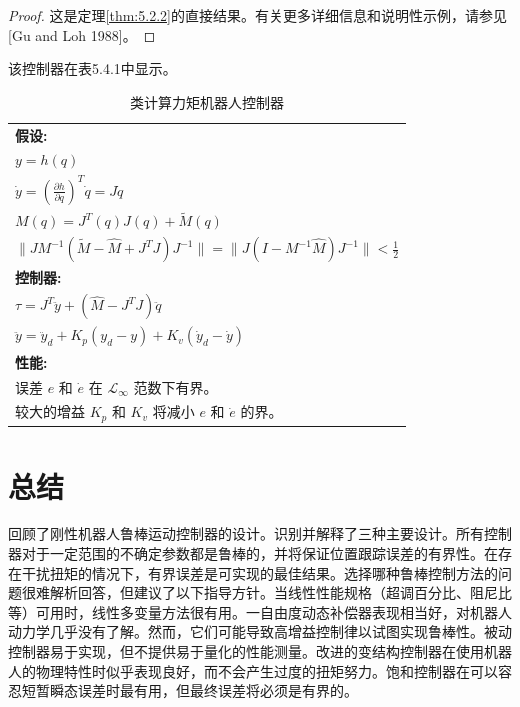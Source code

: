 \documentclass[UTF8,12pt,a4paper]{ctexart}
\begin{document}
\begin{proof}
这是定理\ref{thm:5.2.2}的直接结果。有关更多详细信息和说明性示例，请参见[Gu and Loh 1988]。
\end{proof}

该控制器在表5.4.1中显示。

\begin{table}[htbp]
\centering
\caption{类计算力矩机器人控制器}
\label{tab:5.4.1}
\begin{tabular}{@{}l@{}}
\toprule
\textbf{假设:} \\
\quad $y = h(q)$ \\[1em]
\quad $\dot{y} = \left(\frac{\partial h}{\partial q}\right)^T \dot{q} = J\dot{q}$ \\[1em]
\quad $M(q) = J^T(q)J(q) + \tilde{M}(q)$ \\[1em]
\quad $\|JM^{-1}(\tilde{M} - \hat{M} + J^T J)J^{-1}\| = \|J(I - M^{-1}\hat{M})J^{-1}\| < \frac{1}{2}$ \\[1em]
\midrule
\textbf{控制器:} \\
\quad $\tau = J^T \ddot{y} + (\hat{M} - J^T J)\ddot{q}$ \\[0.5em]
\quad $\ddot{y} = \ddot{y}_d + K_p(y_d - y) + K_v(\dot{y}_d - \dot{y})$ \\[1em]
\midrule
\textbf{性能:} \\
\quad 误差 $e$ 和 $\dot{e}$ 在 $\mathcal{L}_\infty$ 范数下有界。 \\
\quad 较大的增益 $K_p$ 和 $K_v$ 将减小 $e$ 和 $\dot{e}$ 的界。 \\
\bottomrule
\end{tabular}
\end{table}

\section{总结}

回顾了刚性机器人鲁棒运动控制器的设计。识别并解释了三种主要设计。所有控制器对于一定范围的不确定参数都是鲁棒的，并将保证位置跟踪误差的有界性。在存在干扰扭矩的情况下，有界误差是可实现的最佳结果。选择哪种鲁棒控制方法的问题很难解析回答，但建议了以下指导方针。当线性性能规格（超调百分比、阻尼比等）可用时，线性多变量方法很有用。一自由度动态补偿器表现相当好，对机器人动力学几乎没有了解。然而，它们可能导致高增益控制律以试图实现鲁棒性。被动控制器易于实现，但不提供易于量化的性能测量。改进的变结构控制器在使用机器人的物理特性时似乎表现良好，而不会产生过度的扭矩努力。饱和控制器在可以容忍短暂瞬态误差时最有用，但最终误差将必须是有界的。
\end{document}
